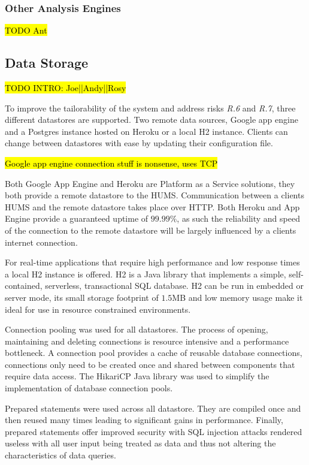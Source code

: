 \documentclass[10pt,a4paper]{article}
\begin{document}

\subsubsection{Other Analysis Engines}
\hl{TODO Ant}

\subsection{Data Storage}
\label{sec:store}
\hl{TODO INTRO: Joe||Andy||Rosy}

To improve the tailorability of the system and address risks \emph{R.6} and \emph{R.7}, three different datastores are supported. Two remote data sources, Google app engine and a Postgres instance hosted on Heroku or a local H2 instance. Clients can change between datastores with ease by updating their configuration file.

\hl{Google app engine connection stuff is nonsense, uses TCP}

Both Google App Engine and Heroku are Platform as a Service solutions, they both provide a remote datastore to the HUMS. Communication between a clients HUMS and the remote datastore takes place over HTTP. Both Heroku and App Engine provide a guaranteed uptime of $99.99\%$, as such the reliability and speed of the connection to the remote datastore will be largely influenced by a clients internet connection.

For real-time applications that require high performance and low response times a local H2 instance is offered. H2 is a Java library that implements a simple, self-contained, serverless, transactional SQL database. H2 can be run in embedded or server mode, its small storage footprint of $1.5$MB and low memory usage make it ideal for use in resource constrained environments. 

Connection pooling was used for all datastores. The process of opening, maintaining and deleting connections is resource intensive and a performance bottleneck. A connection pool provides a cache of reusable database connections, connections only need to be created once and shared between components that require data access. The HikariCP Java library was used to simplify the implementation of database connection pools. 

Prepared statements were used across all datastore. They are compiled once and then reused many times leading to significant gains in performance. Finally, prepared statements offer improved security with SQL injection attacks rendered useless with all user input being treated as data and thus not altering the characteristics of data queries.
\end{document}
